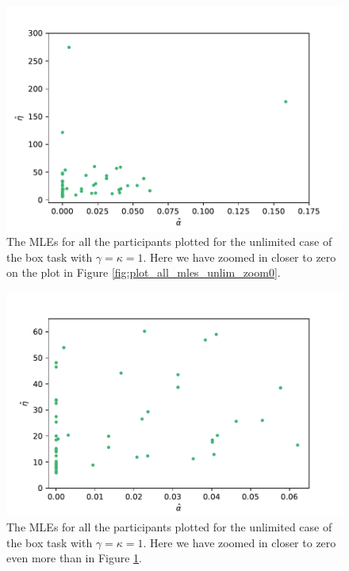 \begin{figure}
    \centering
    \includegraphics[scale=0.7]{pictures/plotted_mles_unlim_gk1_zoom1.pdf}
    \caption[MLEs of $\alpha$ and $\eta$, unlimited with $\gamma=\kappa=1$, zoomed.]{The MLEs for all the participants plotted for the unlimited case of the box task with $\gamma=\kappa=1$. Here we have zoomed in closer to zero on the plot in Figure \ref{fig:plot_all_mles_unlim_zoom0}.}
    \label{fig:plot_all_mles_unlim_zoom1}
\end{figure}

\begin{figure}
    \centering
    \includegraphics[scale=0.7]{pictures/plotted_mles_unlim_gk1_zoom2.pdf}
    \caption[MLEs of $\alpha$ and $\eta$, unlimited with $\gamma=\kappa=1$, zoomed more]{The MLEs for all the participants plotted for the unlimited case of the box task with $\gamma=\kappa=1$. Here we have zoomed in closer to zero even more than in Figure \ref{fig:plot_all_mles_unlim_zoom1}.}
    \label{fig:plot_all_mles_unlim_zoom2}
\end{figure}

